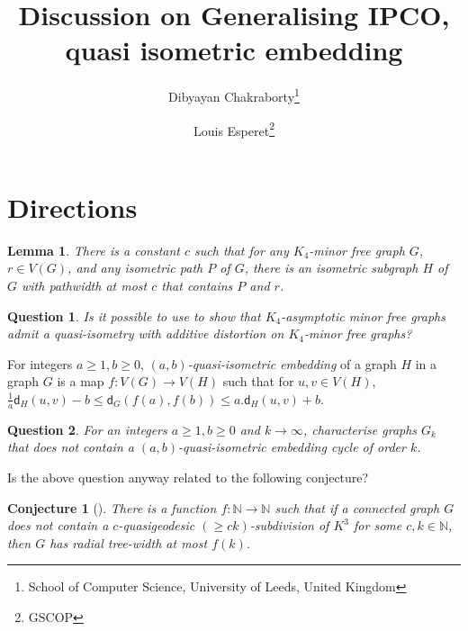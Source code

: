 \documentclass[a4paper]{article}
\title{Discussion on Generalising IPCO, quasi isometric embedding}
\author{Dibyayan Chakraborty\footnote{School of Computer Science, University of Leeds, United Kingdom}
 \and Louis Esperet\footnote{GSCOP}}
\date{}
\newcommand{\distG}[3]{\mathsf{d}_{#1}\left(#2,#3\right)}
\newtheorem{Question}{Question}
\newtheorem{lemma}{Lemma}
\newtheorem{conjecture}[theorem]{Conjecture}
\begin{document}
\maketitle

\section{Directions}
 
 \newcommand{\quasipath}[2]{(#1,#2)\text{-quasi path}\xspace}
  \newcommand{\quasipaths}[2]{(#1,#2)\text{-quasi paths}\xspace}
  
 \begin{lemma}\label{lem:series-parallel}
 There is a constant $c$ such that for any $K_4$-minor free graph $G$, $r\in V(G)$, and any isometric path $P$ of $G$, there is an isometric subgraph $H$ of $G$ with  pathwidth at most $c$ that contains $P$ and $r$. 
 \end{lemma}
 
 \begin{Question}
 	Is it possible to use  to show that $K_4$-asymptotic minor free graphs admit a quasi-isometry with additive distortion on $K_4$-minor free graphs?
 \end{Question}
 
 For integers $a\geq 1,b\geq 0$, \emph{$(a,b)$-quasi-isometric embedding} of a graph $H$ in a graph $G$ is a map $f\colon V(G)\rightarrow V(H)$ such that for  $u,v \in V(H)$, $\frac{1}{a}\distG{H}{u}{v}-b\leq \distG{G}{f(a)}{f(b)} \leq a.\distG{H}{u}{v}+b$.
 
 
 \begin{Question}\label{quest:forbid-cycle}
 	For an integers $a\geq 1,b\geq 0$ and $k\rightarrow\infty$, characterise graphs $G_k$ that does not contain a $(a,b)$-quasi-isometric embedding cycle of order $k$.  
 \end{Question}
 
 Is the above question anyway related to the following conjecture?
 
 \begin{conjecture}[\cite{albrechtsen2023structural}]
There is a function $f\colon \mathbb{N} \rightarrow \mathbb{N}$ such that if a connected graph $G$ does not contain a $c$-quasigeodesic $(\geq ck)$-subdivision of $K^3$ for some $c,k \in \mathbb{N}$, then $G$ has radial tree-width at most $f(k)$. 
 \end{conjecture}
 
\end{document}
